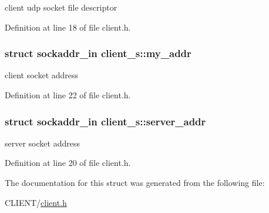 client udp socket file descriptor 



Definition at line 18 of file client.\-h.

\hypertarget{structclient__s_a618e45173f1bb6920a8c9afe885e16be}{
\subsubsection[{my\-\_\-addr}]{\setlength{\rightskip}{0pt plus 5cm}struct sockaddr\-\_\-in client\-\_\-s\-::my\-\_\-addr}}\label{structclient__s_a618e45173f1bb6920a8c9afe885e16be}


client socket address 



Definition at line 22 of file client.\-h.

\hypertarget{structclient__s_a4cb8f28435762b205424d16ea39dcab3}{
\subsubsection[{server\-\_\-addr}]{\setlength{\rightskip}{0pt plus 5cm}struct sockaddr\-\_\-in client\-\_\-s\-::server\-\_\-addr}}\label{structclient__s_a4cb8f28435762b205424d16ea39dcab3}


server socket address 



Definition at line 20 of file client.\-h.



The documentation for this struct was generated from the following file\-:\begin{DoxyCompactItemize}
\item 
C\-L\-I\-E\-N\-T/\hyperlink{client_8h}{client.\-h}\end{DoxyCompactItemize}
